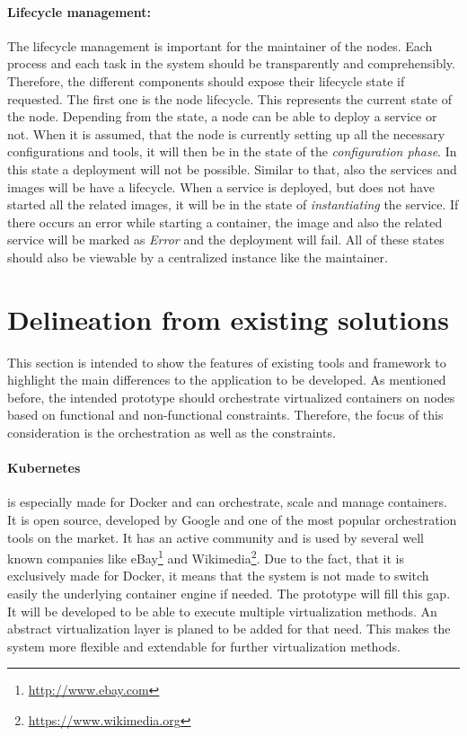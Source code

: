 \paragraph{Lifecycle management:}
The lifecycle management is important for the maintainer of the nodes.
Each process and each task in the system should be transparently and comprehensibly.
Therefore, the different components should expose their lifecycle state if requested.
The first one is the node lifecycle.
This represents the current state of the node.
Depending from the state, a node can be able to deploy a service or not.
When it is assumed, that the node is currently setting up all the necessary configurations and tools, it will then be in the state of the \textit{configuration phase}.
In this state a deployment will not be possible.
Similar to that, also the services and images will be have a lifecycle.
When a service is deployed, but does not have started all the related images, it will be in the state of \textit{instantiating} the service.
If there occurs an error while starting a container, the image and also the related service will be marked as \textit{Error} and the deployment will fail.
All of these states should also be viewable by a centralized instance like the maintainer.


\section{Delineation from existing solutions}
\label{section:delineation-from-existing-solutions}
This section is intended to show the features of existing tools and framework to highlight the main differences to the application to be developed.
As mentioned before, the intended prototype should orchestrate virtualized containers on nodes based on functional and non-functional constraints.
Therefore, the focus of this consideration is the orchestration as well as the constraints.

\paragraph{Kubernetes} is especially made for Docker and can orchestrate, scale and manage containers.
It is open source, developed by Google and one of the most popular orchestration tools on the market.
It has an active community and is used by several well known companies\autocite{Kubernetes:Case-Studies} like eBay\footnote{\url{http://www.ebay.com}} and Wikimedia\footnote{\url{https://www.wikimedia.org}}.
Due to the fact, that it is exclusively made for Docker, it means that the system is not made to switch easily the underlying container engine if needed.
The prototype will fill this gap.
It will be developed to be able to execute multiple virtualization methods.
An abstract virtualization layer is planed to be added for that need.
This makes the system more flexible and extendable for further virtualization methods.

